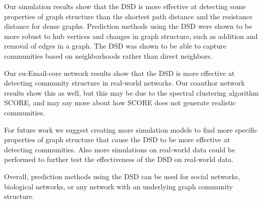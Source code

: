 Our simulation results show that the DSD is more effective at detecting some 
properties of graph structure than the shortest path distance and the
resistance distance for dense graphs. Prediction methods using the DSD were 
shown to be more robust to hub vertices and changes in graph structure, such
as addition and removal of edges in a graph. The DSD was shown to be able to
capture communities based on neighborhoods rather than direct neighbors.

Our eu-Email-core network results show that the DSD is more effective at 
detecting community structure in real-world networks. Our coauthor network 
results show this as well, but this may be due to the spectral clustering
algorithm SCORE, and may say more about how SCORE does not generate 
realistic communities.

For future work we suggest creating more simulation models to find more
specific properties of graph structure that cause the DSD to be more
effective at detecting communities. Also more simulations on real-world data
could be performed to further test the effectiveness of the DSD on real-world
data.

Overall, prediction methods using the DSD can be used for social networks,
biological networks, or any network with an underlying graph community
structure.